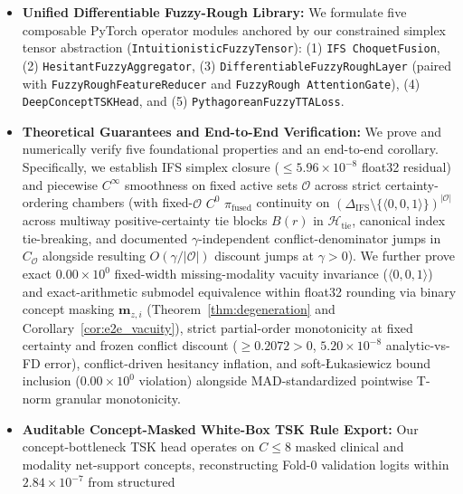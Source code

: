 \documentclass[10pt,twocolumn]{article}
\begin{document}
\begin{itemize}[leftmargin=1.3em,itemsep=1pt,topsep=2pt]
    \item \textbf{Unified Differentiable Fuzzy-Rough Library:} We formulate five composable
    PyTorch operator modules anchored by our constrained simplex tensor abstraction
    (\texttt{Intuitionistic\allowbreak Fuzzy\allowbreak Tensor}): (1) \texttt{IFS\allowbreak
    Choquet\allowbreak Fusion}, (2) \texttt{Hesitant\allowbreak Fuzzy\allowbreak Aggregator},
    (3) \texttt{Differentiable\allowbreak Fuzzy\allowbreak Rough\allowbreak Layer} (paired with
    \texttt{FuzzyRough\allowbreak Feature\allowbreak Reducer} and \texttt{FuzzyRough\allowbreak
    AttentionGate}), (4) \texttt{Deep\allowbreak Concept\allowbreak TSK\allowbreak Head}, and
    (5) \texttt{Pythagorean\allowbreak Fuzzy\allowbreak TTA\allowbreak Loss}.
    \item \textbf{Theoretical Guarantees and End-to-End Verification:}
    We prove and numerically verify five foundational properties and an end-to-end corollary.
    Specifically, we
    establish IFS simplex closure ($\le 5.96\times 10^{-8}$ float32 residual) and piecewise
    $C^\infty$ smoothness on fixed active sets $\mathcal{O}$ across strict certainty-ordering
    chambers (with fixed-$\mathcal{O}$ $C^0$ $\pi_{\text{fused}}$ continuity on
    $(\Delta_{\text{IFS}} \setminus \{\langle 0,0,1\rangle\})^{|\mathcal{O}|}$ across multiway
    positive-certainty tie blocks $B(r)$ in $\mathcal{H}_{\text{tie}}$, canonical index
    tie-breaking, and documented $\gamma$-independent conflict-denominator jumps in
    $C_{\mathcal{O}}$ alongside resulting $O(\gamma/|\mathcal{O}|)$ discount jumps at $\gamma >
    0$). We further prove exact $0.00\times 10^0$ fixed-width missing-modality vacuity
    invariance ($\langle 0,0,1\rangle$) and exact-arithmetic submodel equivalence within
    float32 rounding via binary concept masking $\bm{m}_{z,i}$ (Theorem~\ref{thm:degeneration}
    and Corollary~\ref{cor:e2e_vacuity}), strict partial-order monotonicity at fixed certainty
    and frozen conflict discount ($\ge 0.2072>0$,
    $5.20\times 10^{-8}$ analytic-vs-FD error), conflict-driven hesitancy inflation, and
    soft-{\L}ukasiewicz bound inclusion ($0.00\times 10^0$ violation) alongside
    MAD-standardized pointwise T-norm granular monotonicity.
    \item \textbf{Auditable Concept-Masked White-Box TSK Rule Export:} Our concept-bottleneck
    TSK head operates on $C \le 8$ masked clinical and modality net-support concepts,
    reconstructing Fold-0 validation logits within $2.84 \times 10^{-7}$ from structured

\end{itemize}
\end{document}
